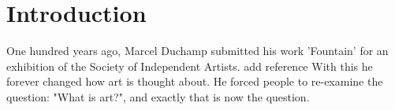 \chapter*{Introduction}
\label{chap:intro}

One hundred years ago, Marcel Duchamp submitted his work 'Fountain' for an exhibition of the Society of Independent Artists. {add reference}
With this he forever changed how art is thought about. He forced people to re-examine the question: "What is art?", and exactly that is now the question.
